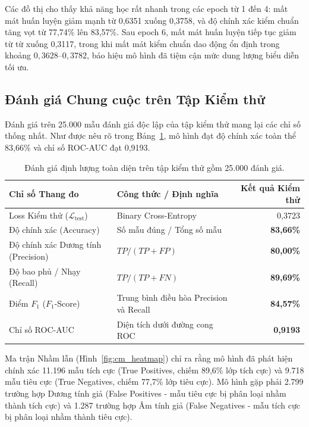 \documentclass[11pt,a4paper]{article}
\begin{document}
Các đồ thị cho thấy khả năng học rất nhanh trong các epoch từ 1 đến 4: mất mát huấn luyện giảm mạnh từ 0,6351 xuống 0,3758, và độ chính xác kiểm chuẩn tăng vọt từ 77,74\% lên 83,57\%. Sau epoch 6, mất mát huấn luyện tiếp tục giảm từ từ xuống 0,3117, trong khi mất mát kiểm chuẩn dao động ổn định trong khoảng $0,3628$--$0,3782$, báo hiệu mô hình đã tiệm cận mức dung lượng biểu diễn tối ưu.

\subsection{Đánh giá Chung cuộc trên Tập Kiểm thử}
Đánh giá trên 25.000 mẫu đánh giá độc lập của tập kiểm thử mang lại các chỉ số thống nhất. Như được nêu rõ trong Bảng~\ref{tab:test_metrics}, mô hình đạt độ chính xác toàn thể 83,66\% và chỉ số ROC-AUC đạt 0,9193.

\begin{table}[H]
\centering
\begin{tabular}{llr}
\toprule
\textbf{Chỉ số Thang đo} & \textbf{Công thức / Định nghĩa} & \textbf{Kết quả Kiểm thử} \\
\midrule
Loss Kiểm thử ($\mathcal{L}_{\text{test}}$) & Binary Cross-Entropy & 0,3723 \\
Độ chính xác (Accuracy)                     & Số mẫu đúng / Tổng số mẫu & \textbf{83,66\%} \\
Độ chính xác Dương tính (Precision)         & $TP / (TP + FP)$ & \textbf{80,00\%} \\
Độ bao phủ / Nhạy (Recall)                  & $TP / (TP + FN)$ & \textbf{89,69\%} \\
Điểm $F_1$ ($F_1$-Score)                    & Trung bình điều hòa Precision và Recall & \textbf{84,57\%} \\
Chỉ số ROC-AUC                              & Diện tích dưới đường cong ROC & \textbf{0,9193} \\
\bottomrule
\end{tabular}
\caption{Đánh giá định lượng toàn diện trên tập kiểm thử gồm 25.000 đánh giá.}
\label{tab:test_metrics}
\end{table}

Ma trận Nhầm lẫn (Hình~\ref{fig:cm_heatmap}) chỉ ra rằng mô hình đã phát hiện chính xác 11.196 mẫu tích cực (True Positives, chiếm 89,6\% lớp tích cực) và 9.718 mẫu tiêu cực (True Negatives, chiếm 77,7\% lớp tiêu cực). Mô hình gặp phải 2.799 trường hợp Dương tính giả (False Positives - mẫu tiêu cực bị phân loại nhầm thành tích cực) và 1.287 trường hợp Âm tính giả (False Negatives - mẫu tích cực bị phân loại nhầm thành tiêu cực).
\end{document}
